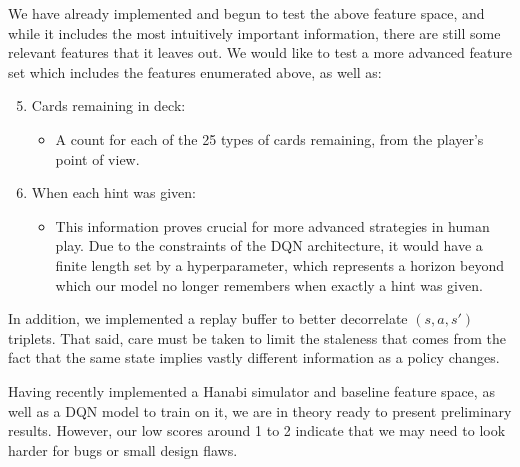 \documentclass{article}
\begin{document}
We have already implemented and begun to test the above feature space, and while it includes the most intuitively important information, there are still some relevant features that it leaves out. We would like to test a more advanced feature set which includes the features enumerated above, as well as:
\begin{enumerate}
  \setcounter{enumi}{4}
\item Cards remaining in deck:
  \begin{itemize}
  \item A count for each of the 25 types of cards remaining, from the player's point of view.
  \end{itemize}
\item When each hint was given:
  \begin{itemize}
  \item This information proves crucial for more advanced strategies in human play. Due to the constraints of the DQN architecture, it would have a finite length set by a hyperparameter, which represents a horizon beyond which our model no longer remembers when exactly a hint was given.
  \end{itemize}
\end{enumerate}


In addition, we implemented a replay buffer to better decorrelate $(s,a,s')$ triplets. That said, care must be taken to limit the staleness that comes from the fact that the same state implies vastly different information as a policy changes.

Having recently implemented a Hanabi simulator and baseline feature space, as well as a DQN model to train on it, we are in theory ready to present preliminary results. However, our low scores around 1 to 2 indicate that we may need to look harder for bugs or small design flaws.





\end{document}
